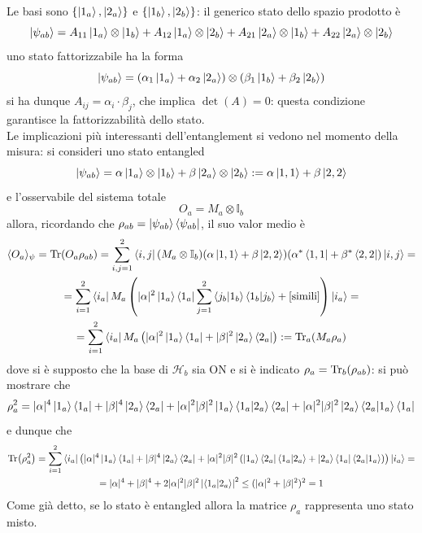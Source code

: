 Le basi sono $\left\{\ket{1_a},\ket{2_a}\right\}$ e $\left\{\ket{1_b},\ket{2_b}\right\}$:
il generico stato dello spazio prodotto è
$$\ket{\psi_{ab}} = A_{11}\ket{1_a}\otimes\ket{1_b} + A_{12}\ket{1_a}\otimes\ket{2_b} + A_{21}
\ket{2_a}\otimes\ket{1_b} + A_{22}\ket{2_a}\otimes\ket{2_b}$$
uno stato fattorizzabile ha la forma
$$\ket{\psi_{ab}} = (\alpha_1\ket{1_a}+\alpha_2\ket{2_a})\otimes(\beta_1\ket{1_b}+\beta_2\ket{2_b})$$
si ha dunque $A_{ij}=\alpha_i\cdot\beta_j$, che implica $\det(A)=0$: questa condizione garantisce la
fattorizzabilità dello stato.\\
Le implicazioni più interessanti dell'entanglement si vedono nel momento della misura: si consideri
uno stato entangled
$$\ket{\psi_{ab}}=\alpha\ket{1_a}\otimes\ket{1_b} + \beta\ket{2_a}\otimes\ket{2_b}:=
\alpha\ket{1,1}+\beta\ket{2,2}$$
e l'osservabile del sistema totale
$$O_a = M_a\otimes\mathbb{I}_b$$
allora, ricordando che $\rho_{ab}=\ket{\psi_{ab}}\bra{\psi_{ab}}$, il suo valor medio è
\begin{gather*}
\langle O_a\rangle_\psi = \Tr(O_a\rho_{ab})=
\sum_{i,j=1}^{2}\bra{i,j}(M_a\otimes\mathbb{I}_b)(\alpha\ket{1,1}+\beta\ket{2,2})
(\alpha^*\bra{1,1}+\beta^*\bra{2,2})\ket{i,j}=\\
=\sum_{i=1}^{2}\bra{i_a}M_a\left(|\alpha|^2\ket{1_a}\bra{1_a} \sum_{j=1}^{2}\bra{j_b}
\ket{1_b}\bra{1_b}\ket{j_b} + [\text{simili}]\right)\ket{i_a}=\\
=\sum_{i=1}^{2}\bra{i_a}M_a\left(|\alpha|^2\ket{1_a}\bra{1_a}+|\beta|^2\ket{2_a}\bra{2_a}\right):=
\Tr_a(M_a\rho_a)
\end{gather*}
dove si è supposto che la base di $\mathcal{H}_b$ sia ON e si è indicato
$\rho_a = \Tr_b(\rho_{ab})$: si può mostrare che
$$\rho_a^2 = |\alpha|^4\ket{1_a}\bra{1_a}+
|\beta|^4\ket{2_a}\bra{2_a} +|\alpha|^2|\beta|^2\ket{1_a}\bra{1_a}\ket{2_a}\bra{2_a}
+|\alpha|^2|\beta|^2\ket{2_a}\bra{2_a}\ket{1_a}\bra{1_a}$$
e dunque che
\begin{gather*}
\Tr(\rho_a^2) = \sum_{i=1}^{2}\bra{i_a}\left(|\alpha|^4\ket{1_a}\bra{1_a}+
|\beta|^4\ket{2_a}\bra{2_a} + |\alpha|^2|\beta|^2 \left(\ket{1_a}\bra{2_a}\bra{1_a}\ket{2_a} + 
\ket{2_a}\bra{1_a}\bra{2_a}\ket{1_a}
\right) \right)\ket{i_a}=\\
=|\alpha|^4+|\beta|^4 + 2|\alpha|^2|\beta|^2\left|\bra{1_a}\ket{2_a}\right|^2\leq(|\alpha|^2+
|\beta|^2)^2 = 1
\end{gather*}
Come già detto, se lo stato è entangled allora la matrice $\rho_a$ rappresenta uno stato misto.

